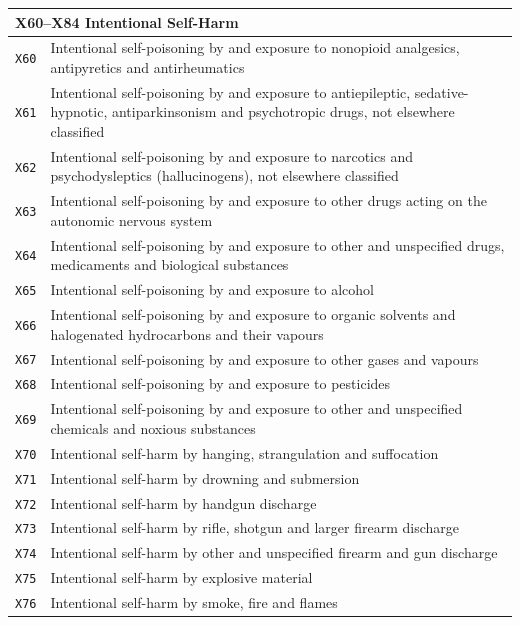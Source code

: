 \begin{longtable}{p{2.2cm} p{10.3cm}}
\multicolumn{2}{l}{\textbf{X60--X84 \quad Intentional Self-Harm}} \\
\midrule
\texttt{X60} & Intentional self-poisoning by and exposure to nonopioid analgesics, antipyretics and antirheumatics \\
\texttt{X61} & Intentional self-poisoning by and exposure to antiepileptic, sedative-hypnotic, antiparkinsonism and psychotropic drugs, not elsewhere classified \\
\texttt{X62} & Intentional self-poisoning by and exposure to narcotics and psychodysleptics (hallucinogens), not elsewhere classified \\
\texttt{X63} & Intentional self-poisoning by and exposure to other drugs acting on the autonomic nervous system \\
\texttt{X64} & Intentional self-poisoning by and exposure to other and unspecified drugs, medicaments and biological substances \\
\texttt{X65} & Intentional self-poisoning by and exposure to alcohol \\
\texttt{X66} & Intentional self-poisoning by and exposure to organic solvents and halogenated hydrocarbons and their vapours \\
\texttt{X67} & Intentional self-poisoning by and exposure to other gases and vapours \\
\texttt{X68} & Intentional self-poisoning by and exposure to pesticides \\
\texttt{X69} & Intentional self-poisoning by and exposure to other and unspecified chemicals and noxious substances \\
\texttt{X70} & Intentional self-harm by hanging, strangulation and suffocation \\
\texttt{X71} & Intentional self-harm by drowning and submersion \\
\texttt{X72} & Intentional self-harm by handgun discharge \\
\texttt{X73} & Intentional self-harm by rifle, shotgun and larger firearm discharge \\
\texttt{X74} & Intentional self-harm by other and unspecified firearm and gun discharge \\
\texttt{X75} & Intentional self-harm by explosive material \\
\texttt{X76} & Intentional self-harm by smoke, fire and flames \\

\end{longtable}
